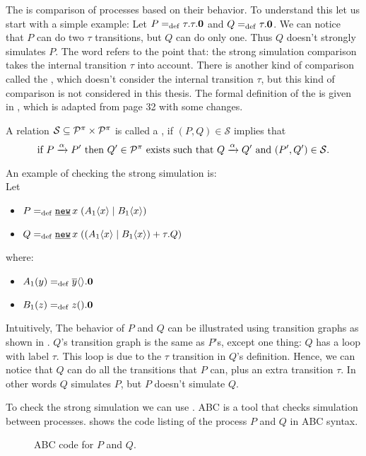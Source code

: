 The  is comparison of processes based on their behavior. To understand this let us start with a simple example:
Let $P=_{\mathrm{def}}\tau.\tau.\mathbf{0}$ and $Q=_{\mathrm{def}}\tau.\mathbf{0}$. We can notice that $P$ can do two $\tau$ transitions, but $Q$ can do only one. Thus $Q$ doesn't strongly simulates $P$. The word  refers to the point that: the strong simulation comparison takes the internal transition $\tau$ into account. There is another kind of comparison called the  , which doesn't consider the internal transition $\tau$, but this kind of comparison is not considered in this thesis. The formal definition of the  is given in , which is adapted from \cite{gieseking} page 32 with some changes.


\begin{definition}
\label{def_strong_sim}
A relation $\mathcal{S}\subseteq\mathcal P^{\pi}\times\mathcal P^{\pi}$ is called a , if $(P,Q)\in\mathcal{S}$ implies that
\[\text{if } P \xrightarrow{\alpha} P' \text{ then }Q'\in\mathcal P^{\pi} \text{ exists such that } Q \xrightarrow{\alpha} Q' \text{ and } (P',Q')\in\mathcal{S}.\]
\end{definition}

An example of checking the strong simulation is:
\\Let
\begin{itemize}
\item $P\define\procres{x}{(\procpar{\proccall{A_1}{x}}{\proccall{B_1}{x}})}$ 
\item $Q\define\procres{x}{(\procchoice{(\procpar{\proccall{A_1}{x}}{\proccall{B_1}{x}})}{\tau.Q})}$
\end{itemize}
where:
\begin{itemize}
\item $A_1(y)=_{\mathrm{def}}{}\overline{y}\langle{}\rangle.\mathbf{0}$
\item $B_1(z)=_{\mathrm{def}}{}z({}).\mathbf{0}$
\end{itemize}

Intuitively, The behavior of $P$ and $Q$ can be illustrated using transition graphs as shown in . $Q$'s transition graph is the same as $P$'s, except one thing: $Q$ has a loop with label $\tau$. This loop is due to the $\tau$ transition in $Q$'s definition. Hence, we can notice that $Q$ can do all the transitions that $P$ can, plus an extra transition $\tau$. In other words $Q$ simulates $P$, but $P$ doesn't simulate $Q$.

To check the strong simulation we can use  \cite{abc}. ABC is a tool that checks simulation between  \picalc{} processes.  shows the code listing of the process $P$ and $Q$ in ABC syntax.
\raggedbottom
\begin{figure}[ht!]

\caption{ABC code for $P$ and $Q$.}
\label{pi_simulation_ABC_code}
\end{figure}

